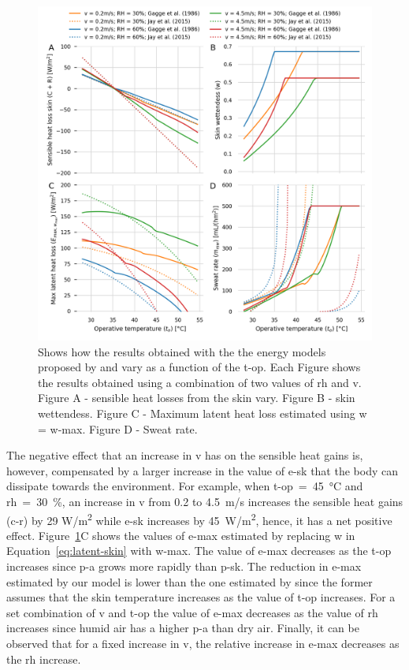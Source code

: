 \begin{figure}[b!]
    \centering
    \includegraphics[width=\textwidth]{figures/comparison_models_v2.png}
    \caption{Shows how the results obtained with the the energy models proposed by  and  vary as a function of the \ac{t-op}.
    Each Figure shows the results obtained using a combination of two values of \ac{rh} and \ac{v}.
    Figure A - sensible heat losses from the skin vary.
    Figure B - skin wettendess.
    Figure C - Maximum latent heat loss estimated using \ac{w} = \ac{w-max}.
    Figure D - Sweat rate.}
    \label{fig:comparison_models}
\end{figure}

The negative effect that an increase in \ac{v} has on the sensible heat gains is, however, compensated by a larger increase in the value of \ac{e-sk} that the body can dissipate towards the environment.
For example, when \ac{t-op}~=~45~°C and \ac{rh}~=~30~\%, an increase in \ac{v} from 0.2 to 4.5~m/s increases the sensible heat gains (\acs{c-r}) by 29 W/m\textsuperscript{2} while \ac{e-sk} increases by 45~W/m\textsuperscript{2}, hence, it has a net positive effect.
Figure~\ref{fig:comparison_models}C shows the values of \ac{e-max} estimated by replacing \ac{w} in Equation~\ref{eq:latent-skin} with \ac{w-max}.
The value of \ac{e-max} decreases as the \ac{t-op} increases since \ac{p-a} grows more rapidly than \ac{p-sk}.
The reduction in \ac{e-max} estimated by our model is lower than the one estimated by  since the former assumes that the skin temperature increases as the value of \ac{t-op} increases.
For a set combination of \ac{v} and \ac{t-op} the value of \ac{e-max} decreases as the value of \ac{rh} increases since humid air has a higher \ac{p-a} than dry air.
Finally, it can be observed that for a fixed increase in \ac{v}, the relative increase in \ac{e-max} decreases as the \ac{rh} increase.

